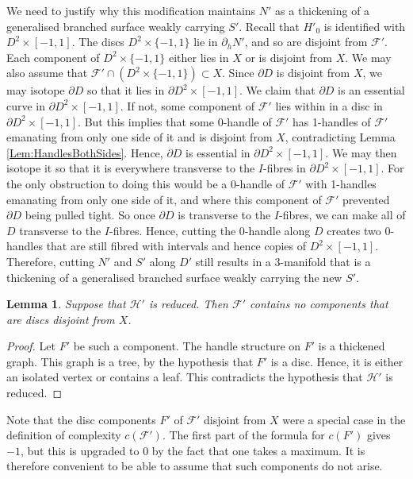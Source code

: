 \documentclass[oneside]{amsart}
\numberwithin{equation}{section}
\theoremstyle{plain}
\newtheorem{lemma}[equation]{Lemma}
\theoremstyle{definition}
\newcommand{\calF}{\mathcal{F}}
\begin{document}
We need to justify why this modification maintains $N'$ as a thickening of a generalised branched surface weakly carrying $S'$.
Recall that $H'_0$ is identified with $D^2 \times [-1,1]$. The discs $D^2 \times \{ -1,1 \}$ lie in $\partial_hN'$, and so are disjoint from $\calF'$. 
Each component of $D^2 \times \{ -1,1 \}$ either lies in $X$ or is disjoint from $X$.
We may also assume that $\mathcal{F}' \cap (D^2 \times \{-1,1\}) \subset X$.
Since $\partial D$ is disjoint from $X$, we may isotope $\partial D$ so that it lies in $\partial D^2 \times [-1,1]$.
We claim that $\partial D$ is an essential curve in $\partial D^2 \times [-1,1]$. 
If not, some component of $\calF'$ lies within in a disc in
$\partial D^2 \times [-1,1]$. But this implies that some 0-handle of $\calF'$ has 1-handles of $\calF'$ emanating
from only one side of it and is disjoint from $X $, contradicting Lemma \ref{Lem:HandlesBothSides}.
Hence, $\partial D$ is essential in $\partial D^2 \times [-1,1]$. We may then isotope it so that it is everywhere
transverse to the $I$-fibres in $\partial D^2 \times [-1,1]$. For the only obstruction to doing this would be a
0-handle of $\calF'$ with 1-handles emanating from only one side of it, and where this component of $\calF'$
prevented $\partial D$ being pulled tight. So once $\partial D$ is transverse to the $I$-fibres, we can
make all of $D$ transverse to the $I$-fibres. Hence, cutting the 0-handle along $D$ creates two 0-handles
that are still fibred with intervals and hence copies of $D^2 \times [-1,1]$. Therefore, cutting $N'$ and $S'$ along $D'$
still results in a 3-manifold that is a thickening of a generalised branched surface weakly carrying the new $S'$.



\begin{lemma}
\label{Lem:NoDiscs}
Suppose that $\mathcal{H}'$ is reduced. Then $\mathcal{F}'$ contains
no components that are discs disjoint from $X$.
\end{lemma}

\begin{proof}
Let $F'$ be such a component. The handle structure on $F'$ is a thickened graph.
This graph is a tree, by the hypothesis that $F'$ is a disc. Hence, it is either an isolated
vertex or contains a leaf. This contradicts the hypothesis that $\mathcal{H}'$ is reduced.
\end{proof}

Note that the disc components $F'$ of $\mathcal{F}'$ disjoint from $X$ were a special case in
the definition of complexity $c(\mathcal{F}')$. The first part of the formula for $c(F')$ gives
$-1$, but this is upgraded to $0$ by the fact that one takes a maximum.
It is therefore convenient to be able to assume that such components
do not arise.
\end{document}
